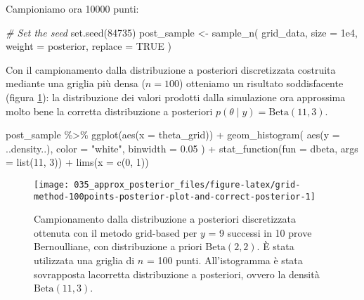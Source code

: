 \documentclass[
]{memoir}
\newenvironment{Shaded}{\begin{snugshade}}{\end{snugshade}}
\newcommand{\AttributeTok}[1]{\textcolor[rgb]{0.77,0.63,0.00}{#1}}
\newcommand{\CommentTok}[1]{\textcolor[rgb]{0.56,0.35,0.01}{\textit{#1}}}
\newcommand{\ConstantTok}[1]{\textcolor[rgb]{0.00,0.00,0.00}{#1}}
\newcommand{\DecValTok}[1]{\textcolor[rgb]{0.00,0.00,0.81}{#1}}
\newcommand{\FloatTok}[1]{\textcolor[rgb]{0.00,0.00,0.81}{#1}}
\newcommand{\FunctionTok}[1]{\textcolor[rgb]{0.00,0.00,0.00}{#1}}
\newcommand{\NormalTok}[1]{#1}
\newcommand{\OtherTok}[1]{\textcolor[rgb]{0.56,0.35,0.01}{#1}}
\newcommand{\SpecialCharTok}[1]{\textcolor[rgb]{0.00,0.00,0.00}{#1}}
\newcommand{\StringTok}[1]{\textcolor[rgb]{0.31,0.60,0.02}{#1}}
\begin{document}
\noindent
Campioniamo ora 10000 punti:

\begin{Shaded}
\begin{Highlighting}[]
\CommentTok{\# Set the seed}
\FunctionTok{set.seed}\NormalTok{(}\DecValTok{84735}\NormalTok{)}
\NormalTok{post\_sample }\OtherTok{\textless{}{-}} \FunctionTok{sample\_n}\NormalTok{(}
\NormalTok{  grid\_data,}
  \AttributeTok{size =} \FloatTok{1e4}\NormalTok{,}
  \AttributeTok{weight =}\NormalTok{ posterior,}
  \AttributeTok{replace =} \ConstantTok{TRUE}
\NormalTok{)}
\end{Highlighting}
\end{Shaded}

\noindent
Con il campionamento dalla distribuzione a posteriori discretizzata costruita mediante una griglia più densa (\(n = 100\)) otteniamo un risultato soddisfacente (figura \ref{fig:grid-method-100points-posterior-plot-and-correct-posterior}): la distribuzione dei valori prodotti dalla simulazione ora approssima molto bene la corretta distribuzione a posteriori \(p(\theta \mid y) = \mbox{Beta}(11, 3)\).

\begin{Shaded}
\begin{Highlighting}[]
\NormalTok{post\_sample }\SpecialCharTok{\%\textgreater{}\%}
  \FunctionTok{ggplot}\NormalTok{(}\FunctionTok{aes}\NormalTok{(}\AttributeTok{x =}\NormalTok{ theta\_grid)) }\SpecialCharTok{+}
  \FunctionTok{geom\_histogram}\NormalTok{(}
    \FunctionTok{aes}\NormalTok{(}\AttributeTok{y =}\NormalTok{ ..density..), }
    \AttributeTok{color =} \StringTok{"white"}\NormalTok{, }
    \AttributeTok{binwidth =} \FloatTok{0.05}
\NormalTok{  ) }\SpecialCharTok{+}
  \FunctionTok{stat\_function}\NormalTok{(}\AttributeTok{fun =}\NormalTok{ dbeta, }\AttributeTok{args =} \FunctionTok{list}\NormalTok{(}\DecValTok{11}\NormalTok{, }\DecValTok{3}\NormalTok{)) }\SpecialCharTok{+}
  \FunctionTok{lims}\NormalTok{(}\AttributeTok{x =} \FunctionTok{c}\NormalTok{(}\DecValTok{0}\NormalTok{, }\DecValTok{1}\NormalTok{))}
\end{Highlighting}
\end{Shaded}

\begin{figure}

{\centering \texttt{[image: 035\_approx\_posterior\_files/figure-latex/grid-method-100points-posterior-plot-and-correct-posterior-1]} 

}

\caption{Campionamento dalla  distribuzione a posteriori discretizzata ottenuta con il metodo grid-based per $y$ = 9 successi in 10 prove Bernoulliane, con distribuzione a priori $\mbox{Beta}(2, 2)$. È stata utilizzata una griglia di $n$ = 100 punti. All'istogramma è stata sovrapposta lacorretta distribuzione a posteriori, ovvero la densità $\mbox{Beta}(11, 3)$.}\label{fig:grid-method-100points-posterior-plot-and-correct-posterior}
\end{figure}
\end{document}

